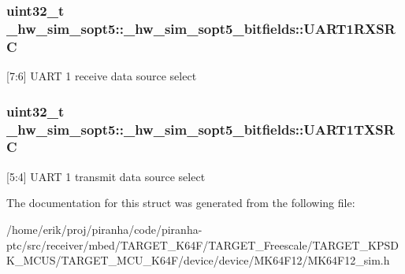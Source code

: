 \subsubsection[{\texorpdfstring{U\+A\+R\+T1\+R\+X\+S\+RC}{UART1RXSRC}}]{\setlength{\rightskip}{0pt plus 5cm}uint32\+\_\+t \+\_\+hw\+\_\+sim\+\_\+sopt5\+::\+\_\+hw\+\_\+sim\+\_\+sopt5\+\_\+bitfields\+::\+U\+A\+R\+T1\+R\+X\+S\+RC}\hypertarget{struct__hw__sim__sopt5_1_1__hw__sim__sopt5__bitfields_a919ff4ee1faac818f668d008d13b7d60}{}\label{struct__hw__sim__sopt5_1_1__hw__sim__sopt5__bitfields_a919ff4ee1faac818f668d008d13b7d60}
\mbox{[}7\+:6\mbox{]} U\+A\+RT 1 receive data source select 
\subsubsection[{\texorpdfstring{U\+A\+R\+T1\+T\+X\+S\+RC}{UART1TXSRC}}]{\setlength{\rightskip}{0pt plus 5cm}uint32\+\_\+t \+\_\+hw\+\_\+sim\+\_\+sopt5\+::\+\_\+hw\+\_\+sim\+\_\+sopt5\+\_\+bitfields\+::\+U\+A\+R\+T1\+T\+X\+S\+RC}\hypertarget{struct__hw__sim__sopt5_1_1__hw__sim__sopt5__bitfields_af643aa3312b77d2f017d6935618f2888}{}\label{struct__hw__sim__sopt5_1_1__hw__sim__sopt5__bitfields_af643aa3312b77d2f017d6935618f2888}
\mbox{[}5\+:4\mbox{]} U\+A\+RT 1 transmit data source select 

The documentation for this struct was generated from the following file\+:\begin{DoxyCompactItemize}
\item 
/home/erik/proj/piranha/code/piranha-\/ptc/src/receiver/mbed/\+T\+A\+R\+G\+E\+T\+\_\+\+K64\+F/\+T\+A\+R\+G\+E\+T\+\_\+\+Freescale/\+T\+A\+R\+G\+E\+T\+\_\+\+K\+P\+S\+D\+K\+\_\+\+M\+C\+U\+S/\+T\+A\+R\+G\+E\+T\+\_\+\+M\+C\+U\+\_\+\+K64\+F/device/device/\+M\+K64\+F12/M\+K64\+F12\+\_\+sim.\+h\end{DoxyCompactItemize}
